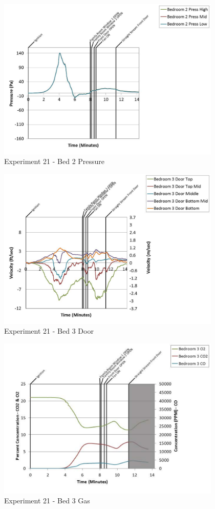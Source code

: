 \documentclass{article}
\begin{document}
\begin{appendices}
	\clearpage

	\begin{figure}[h!]
		\centering
		\includegraphics[height=3.05in]{0_Images/Results_Charts/Exp_21_Charts/Bed2Pressure.pdf}
		\caption{Experiment 21 - Bed 2 Pressure}
	\end{figure}
 

	\begin{figure}[h!]
		\centering
		\includegraphics[height=3.05in]{0_Images/Results_Charts/Exp_21_Charts/Bed3Door.pdf}
		\caption{Experiment 21 - Bed 3 Door}
	\end{figure}
 
	\clearpage

	\begin{figure}[h!]
		\centering
		\includegraphics[height=3.05in]{0_Images/Results_Charts/Exp_21_Charts/Bed3Gas.pdf}
		\caption{Experiment 21 - Bed 3 Gas}
	\end{figure}
 


\end{appendices}
\end{document}
